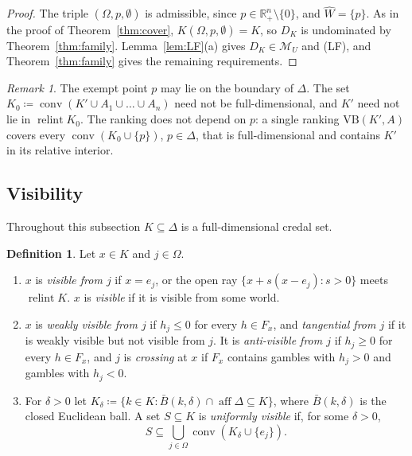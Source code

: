\documentclass[11pt]{article}
\newcommand{\R}{\mathbb{R}}
\newcommand{\M}{\mathcal{M}}
\newcommand{\VB}{\mathrm{VB}}
\DeclareMathOperator{\conv}{conv}
\DeclareMathOperator{\relint}{relint}
\DeclareMathOperator{\aff}{aff}
\theoremstyle{plain}
\theoremstyle{definition}
\newtheorem{definition}[theorem]{Definition}
\theoremstyle{remark}
\newtheorem{remark}[theorem]{Remark}
\begin{document}
\begin{proof}
The triple $(\Omega,p,\emptyset)$ is admissible, since $p\in\R^n_+\setminus\{0\}$, and
$\hat W=\{p\}$. As in the proof of Theorem~\ref{thm:cover}, $K(\Omega,p,\emptyset)=K$, so
$D_K$ is undominated by Theorem~\ref{thm:family}. Lemma~\ref{lem:LF}(a) gives $D_K\in
\M_U$ and (LF), and Theorem~\ref{thm:family} gives the remaining requirements.
\end{proof}

\begin{remark}\label{rem:exempt}
The exempt point $p$ may lie on the boundary of $\Delta$. The set
$K_0\coloneqq\conv(K'\cup A_1\cup\dots\cup A_n)$ need not be full-dimensional, and $K'$
need not lie in $\relint K_0$. The ranking does not depend on $p$: a single ranking
$\VB(K',A)$ covers every $\conv(K_0\cup\{p\})$, $p\in\Delta$, that is full-dimensional and
contains $K'$ in its relative interior.
\end{remark}

\subsection{Visibility}\label{sec:vis}

Throughout this subsection $K\subseteq\Delta$ is a full-dimensional credal set.

\begin{definition}\label{def:vis}
Let $x\in K$ and $j\in\Omega$.
\begin{enumerate}[label=(\alph*)]
  \item $x$ is \emph{visible from $j$} if $x=e_j$, or the open ray $\{x+s(x-e_j):s>0\}$
  meets $\relint K$. $x$ is \emph{visible} if it is visible from some world.
  \item $x$ is \emph{weakly visible from $j$} if $h_j\le0$ for every $h\in F_x$, and
  \emph{tangential from $j$} if it is weakly visible but not visible from $j$. It is
  \emph{anti-visible from $j$} if $h_j\ge0$ for every $h\in F_x$, and $j$ is
  \emph{crossing} at $x$ if $F_x$ contains gambles with $h_j>0$ and gambles with $h_j<0$.
  \item For $\delta>0$ let $K_\delta\coloneqq\{k\in K:\bar B(k,\delta)\cap\aff\Delta
  \subseteq K\}$, where $\bar B(k,\delta)$ is the closed Euclidean ball. A set $S\subseteq
  K$ is \emph{uniformly visible} if, for some $\delta>0$,
  \[
    S\subseteq\bigcup_{j\in\Omega}\conv(K_\delta\cup\{e_j\}).
  \]
\end{enumerate}
\end{definition}
\end{document}
